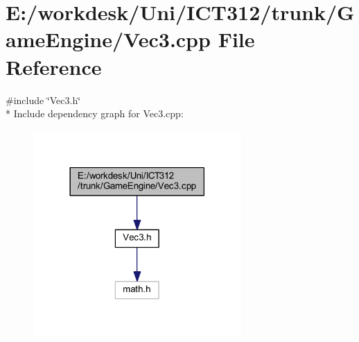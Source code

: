 \section{E\+:/workdesk/\+Uni/\+I\+C\+T312/trunk/\+Game\+Engine/\+Vec3.cpp File Reference}
\label{_vec3_8cpp}
{\ttfamily \#include \char`\"{}Vec3.\+h\char`\"{}}\\*
Include dependency graph for Vec3.\+cpp\+:\nopagebreak
\begin{figure}[H]
\begin{center}
\leavevmode
\includegraphics[width=225pt]{da/d60/_vec3_8cpp__incl}
\end{center}
\end{figure}
